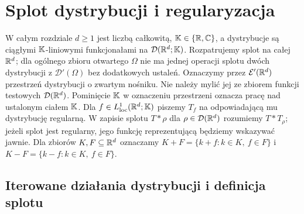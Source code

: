 
\section{Splot dystrybucji i regularyzacja}
\label{sec:splot21}

\providecommand{\atlasref}[2]{#2}


W całym rozdziale $d\ge1$ jest liczbą całkowitą,
$\mathbb K\in\{\mathbb R,\mathbb C\}$, a dystrybucje
są ciągłymi $\mathbb K$-liniowymi funkcjonałami na
$\mathcal D(\mathbb R^d;\mathbb K)$. Rozpatrujemy splot na całej
$\mathbb R^d$; dla ogólnego zbioru otwartego $\Omega$ nie ma
jednej operacji splotu dwóch dystrybucji z
$\mathcal D'(\Omega)$ bez dodatkowych ustaleń.
Oznaczymy przez $\mathcal E'(\mathbb R^d)$ przestrzeń dystrybucji
o zwartym nośniku. Nie należy mylić jej ze zbiorem funkcji
testowych $\mathcal D(\mathbb R^d)$. Pominięcie $\mathbb K$ w oznaczeniu
przestrzeni oznacza pracę nad ustalonym ciałem $\mathbb K$.
Dla $f\in L^1_{\mathrm{loc}}(\mathbb R^d;\mathbb K)$ piszemy $T_f$ na
odpowiadającą mu dystrybucję regularną. W zapisie splotu
$T*\rho$ dla $\rho\in\mathcal D(\mathbb R^d)$ rozumiemy
$T*T_\rho$; jeżeli splot jest regularny, jego funkcję
reprezentującą będziemy wskazywać jawnie.
Dla zbiorów $K,F\subseteq\mathbb R^d$ oznaczamy
$K+F=\{k+f:k\in K,\ f\in F\}$ i
$K-F=\{k-f:k\in K,\ f\in F\}$.

\subsection{Iterowane działania dystrybucji i definicja splotu}

